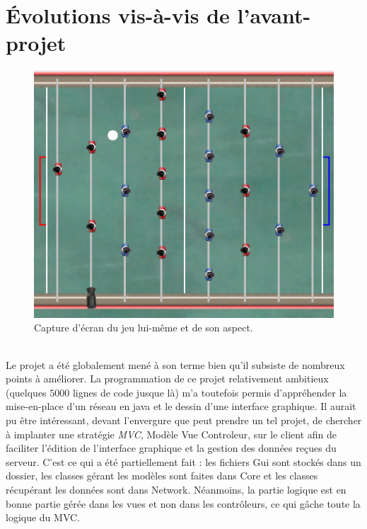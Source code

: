 \documentclass[a4paper,12pt]{report}
\begin{document}
\part{Évolutions vis-à-vis de l'avant-projet}
\begin{figure}[H]
	\begin{center}
	\includegraphics[width=15cm]{pictures/jeu.png} 
	\end{center}
	\caption{Capture d'écran du jeu lui-même et de son aspect.}
    \end{figure}
\paragraph{}
Le projet a été globalement mené à son terme bien qu'il subsiste de nombreux points à améliorer. La programmation de ce projet relativement ambitieux (quelques $5000$ lignes de code jusque là) m'a toutefois permis d'appréhender la mise-en-place d'un réseau en java et le dessin d'une interface graphique. Il aurait pu être intéressant, devant l'envergure que peut prendre un tel projet, de chercher à implanter une stratégie \emph{MVC}, Modèle Vue Controleur, sur le client afin de faciliter l'édition de l'interface graphique et la gestion des données reçues du serveur. C'est ce qui a été partiellement fait : les fichiers Gui sont stockés dans un dossier, les classes gérant les modèles sont faites dans Core et les classes récupérant les données sont dans Network. Néanmoins, la partie logique est en bonne partie gérée dans les vues et non dans les contrôleurs, ce qui gâche toute la logique du MVC.
\end{document}
